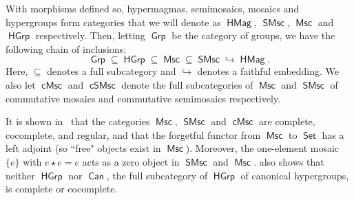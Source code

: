 \documentclass[reqno]{amsart}
\newcommand{\cat}[1]{\ensuremath{\mathsf{#1}}}
\DeclareMathOperator{\Set}{\cat{Set}}
\DeclareMathOperator{\Grp}{\cat{Grp}}
\DeclareMathOperator{\HMag}{\cat{HMag}}
\DeclareMathOperator{\Msc}{\cat{Msc}}
\DeclareMathOperator{\cMsc}{\cat{cMsc}}
\DeclareMathOperator{\cSMsc}{\cat{cSMsc}}
\DeclareMathOperator{\SMsc}{\cat{SMsc}}
\DeclareMathOperator{\Can}{\cat{Can}}
\DeclareMathOperator{\HGrp}{\cat{HGrp}}
\numberwithin{equation}{section}
\theoremstyle{plain}
\theoremstyle{definition}
\begin{document}
With morphisms defined so, hypermagmas, semimosaics, mosaics and hypergroups form categories that we will denote as $\HMag$, $\SMsc$, $\Msc$ and $\HGrp$ respectively. Then, letting $\Grp$ be the category of groups, we have the following chain of inclusions:
$$
\Grp \subseteq \HGrp \subseteq \Msc \subseteq \SMsc \hookrightarrow \HMag.
$$
Here, $\subseteq$ denotes a full subcategory and $\hookrightarrow$ denotes a faithful embedding. We also let $\cMsc$ and $\cSMsc$ denote the full subcategories of $\Msc$ and $\SMsc$ of commutative mosaics and commutative semimosaics respectively. 

It is shown in~\cite{NakamuraReyes} that the categories $\Msc$, $\SMsc$ and $\cMsc$ are complete, cocomplete, and regular, and that the forgetful functor from $\Msc$ to $\Set$ has a left adjoint (so ``free" objects exist in $\Msc$). Moreover, the one-element mosaic $\{e\}$ with $e\star e=e$ acts as a zero object in $\SMsc$ and $\Msc$. \cite{NakamuraReyes} also shows that neither $\HGrp$ nor $\Can$, the full subcategory of $\HGrp$ of canonical hypergroups, is complete or cocomplete. 
\end{document}
